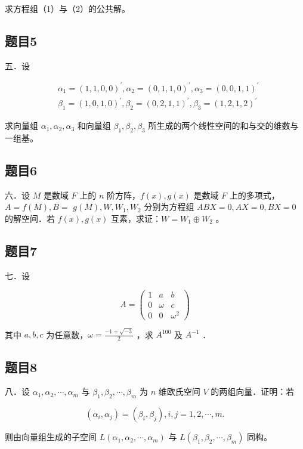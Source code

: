 \documentclass{article}
\begin{document}
求方程组（1）与（2）的公共解。

\subsection{题目5}
五．设

\[
\begin{aligned}
& \alpha_{1}=(1,1,0,0)^{\prime}, \alpha_{2}=(0,1,1,0)^{\prime}, \alpha_{3}=(0,0,1,1)^{\prime} \\
& \beta_{1}=(1,0,1,0)^{\prime}, \beta_{2}=(0,2,1,1)^{\prime}, \beta_{3}=(1,2,1,2)^{\prime}
\end{aligned}
\]

求向量组 \(\alpha_{1}, \alpha_{2}, \alpha_{3}\) 和向量组 \(\beta_{1}, \beta_{2}, \beta_{3}\) 所生成的两个线性空间的和与交的维数与一组基。

\subsection{题目6}
六．设 \(M\) 是数域 \(F\) 上的 \(n\) 阶方阵，\(f(x), g(x)\) 是数域 \(F\) 上的多项式，\(A=f(M), B=\) \(g(M), W, W_{1}, W_{2}\) 分别为方程组 \(A B X=0, A X=0, B X=0\) 的解空间．若 \(f(x), g(x)\) 互素，求证：\(W=W_{1} \oplus W_{2}\) 。

\subsection{题目7}
七．设

\[
A=\left(\begin{array}{ccc}
1 & a & b \\
0 & \omega & c \\
0 & 0 & \omega^{2}
\end{array}\right)
\]

其中 \(a, b, c\) 为任意数，\(\omega=\frac{-1+\sqrt{-3}}{2}\) ，求 \(A^{100}\) 及 \(A^{-1}\) ．

\subsection{题目8}
八．设 \(\alpha_{1}, \alpha_{2}, \cdots, \alpha_{m}\) 与 \(\beta_{1}, \beta_{2}, \cdots, \beta_{m}\) 为 \(n\) 维欧氏空间 \(V\) 的两组向量．证明：若

\[
\left(\alpha_{i}, \alpha_{j}\right)=\left(\beta_{i}, \beta_{j}\right), i, j=1,2, \cdots, m .
\]

则由向量组生成的子空间 \(L\left(\alpha_{1}, \alpha_{2}, \cdots, \alpha_{m}\right)\) 与 \(L\left(\beta_{1}, \beta_{2}, \cdots, \beta_{m}\right)\) 同构。
\end{document}
